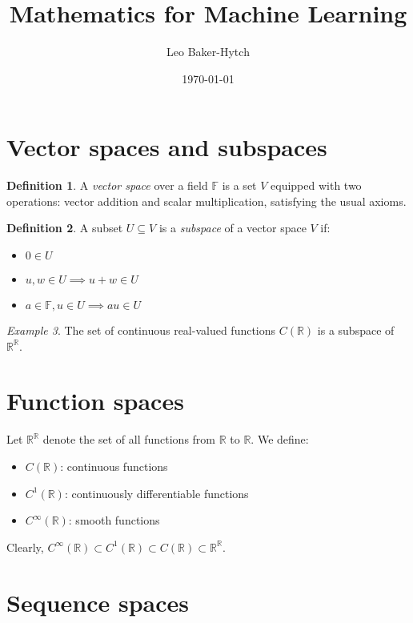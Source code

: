 \documentclass[11pt]{article}
\title{Mathematics for Machine Learning}
\author{Leo Baker-Hytch}
\date{\today}
\newcommand{\F}{\mathbb{F}}
\newcommand{\R}{\mathbb{R}}
\theoremstyle{definition}
\newtheorem{definition}{Definition}[section]
\theoremstyle{plain}
\theoremstyle{remark}
\newtheorem{example}[definition]{Example}
\begin{document}
\maketitle
\tableofcontents
\vspace{1em}

\section{Vector spaces and subspaces}

\begin{definition}
    A \emph{vector space} over a field \( \F \) is a set \( V \) equipped with two operations: vector addition and
    scalar multiplication, satisfying the usual axioms.
\end{definition}

\begin{definition}
    A subset \( U \subseteq V \) is a \emph{subspace} of a vector space \( V \) if:
    \begin{itemize}
        \item \( 0 \in U \)
        \item \( u, w \in U \implies u + w \in U \)
        \item \( a \in \F, u \in U \implies a u \in U \)
    \end{itemize}
\end{definition}

\begin{example}
    The set of continuous real-valued functions \( C(\R) \) is a subspace of \( \R^\R \).
\end{example}

\section{Function spaces}

Let \( \R^\R \) denote the set of all functions from \( \R \) to \( \R \). We define:

\begin{itemize}
    \item \( C(\R) \): continuous functions
    \item \( C^1(\R) \): continuously differentiable functions
    \item \( C^\infty(\R) \): smooth functions
\end{itemize}

Clearly, \( C^\infty(\R) \subset C^1(\R) \subset C(\R) \subset \R^\R \).

\section{Sequence spaces}
\end{document}

